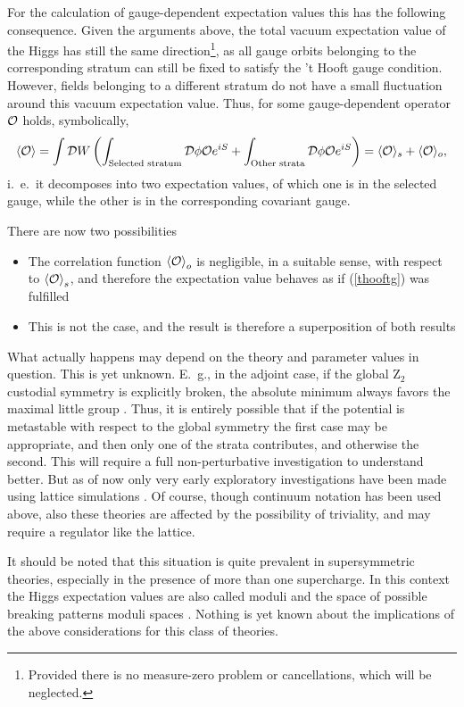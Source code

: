 \documentclass[final,12pt]{article}
\newcommand*{\be}{\begin{equation}}
\newcommand*{\ee}{\end{equation}}
\newcommand*{\pref}[1]{(\ref{#1})}
\newcommand*{\1}{1\!\!\!\bot}
\newcommand*{\la}{\left\langle}
\newcommand*{\ra}{\right\rangle}
\newcommand*{\op}{{\cal O}}
\begin{document}
For the calculation of gauge-dependent expectation values this has the following consequence. Given the arguments above, the total vacuum expectation value of the Higgs has still the same direction\footnote{Provided there is no measure-zero problem or cancellations, which will be neglected.}, as all gauge orbits belonging to the corresponding stratum can still be fixed to satisfy the 't Hooft gauge condition. However, fields belonging to a different stratum do not have a small fluctuation around this vacuum expectation value. Thus, for some gauge-dependent operator $\op$ holds, symbolically,
\be
\langle\op\rangle=\int{\cal D}W\left(\int_\text{Selected stratum}{\cal D}\phi \op e^{iS}+\int_\text{Other strata}{\cal D}\phi \op e^{iS}\right)=\langle \op\rangle_s+\langle \op\rangle_o\label{mppi},
\ee
\noindent i.\ e.\ it decomposes into two expectation values, of which one is in the selected gauge, while the other is in the corresponding covariant gauge.

There are now two possibilities
\begin{itemize}
 \item The correlation function $\la\op\ra_o$ is negligible, in a suitable sense, with respect to $\la\op\ra_s$, and therefore the expectation value behaves as if \pref{thooftg} was fulfilled
 \item This is not the case, and the result is therefore a superposition of both results
\end{itemize}
What actually happens may depend on the theory and parameter values in question. This is yet unknown. E.\ g., in the adjoint case, if the global Z$_2$ custodial symmetry is explicitly broken, the absolute minimum always favors the maximal little group \cite{O'Raifeartaigh:1986vq}. Thus, it is entirely possible that if the potential is metastable with respect to the global symmetry the first case may be appropriate, and then only one of the strata contributes, and otherwise the second. This will require a full non-perturbative investigation to understand better. But as of now only very early exploratory investigations have been made using lattice simulations \cite{Gupta:1983zv,Lee:1985yi,Olynyk:1985tr,Kikugawa:1985ex,Azcoiti:1987ua}. Of course, though continuum notation has been used above, also these theories are affected by the possibility of triviality, and may require a regulator like the lattice.

It should be noted that this situation is quite prevalent in supersymmetric theories, especially in the presence of more than one supercharge. In this context the Higgs expectation values are also called moduli and the space of possible breaking patterns moduli spaces \cite{Weinberg:2000cr}. Nothing is yet known about the implications of the above considerations for this class of theories.
\end{document}
